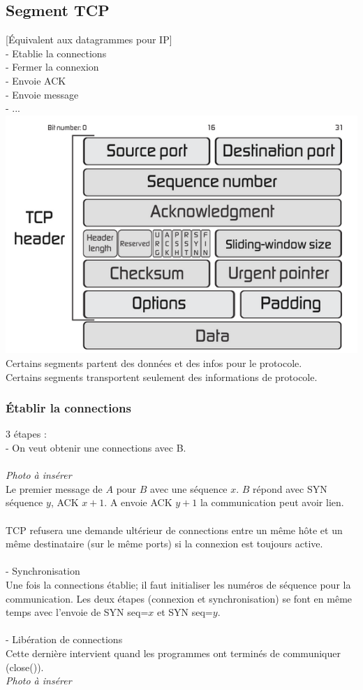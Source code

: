 \documentclass{article}
\begin{document}
\subsection{Segment TCP}
[Équivalent aux datagrammes pour IP] \\
- Etablie la connections \\ 
- Fermer la connexion \\
- Envoie ACK \\
- Envoie message \\
- ... \\
\includegraphics{tcp.png} \\
\newpage
Certains segments partent des données et des infos pour le protocole. \\
Certains segments transportent seulement des informations de protocole. \\
\subsubsection{Établir la connections}
3 étapes : \\
- On veut obtenir une connections avec B.\\
\\ \emph{Photo à insérer} \\
Le premier message de $A$ pour $B$ avec une séquence $x$. $B$ répond avec SYN séquence $y$, ACK $x+1$. A envoie ACK $y+1$ la communication peut avoir lien. \\
\\
TCP refusera une demande ultérieur de connections entre un même hôte et un même destinataire (sur le même ports) si la connexion est toujours active. \\
\\
- Synchronisation \\
Une fois la connections établie; il faut initialiser les numéros de séquence pour la communication. Les deux étapes (connexion et synchronisation) se font en même temps avec l'envoie de SYN seq=$x$ et SYN seq=$y$. \\
\\
- Libération de connections \\
Cette dernière intervient quand les programmes ont terminés de communiquer (close()). \\
\emph{Photo à insérer} \\
\end{document}
